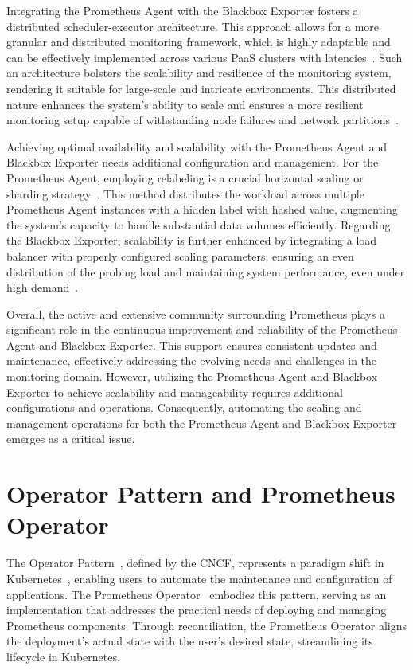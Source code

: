 Integrating the Prometheus Agent with the Blackbox Exporter fosters a distributed scheduler-executor architecture. This approach allows for a more granular and distributed monitoring framework, which is highly adaptable and can be effectively implemented across various \ac{PaaS} clusters with latencies~\parencite{UnderstandingUsingMultitarget}. Such an architecture bolsters the scalability and resilience of the monitoring system, rendering it suitable for large-scale and intricate environments. This distributed nature enhances the system's ability to scale and ensures a more resilient monitoring setup capable of withstanding node failures and network partitions~\parencite{plotkaIntroducingPrometheusAgent2021}.

Achieving optimal availability and scalability with the Prometheus Agent and Blackbox Exporter needs additional configuration and management. For the Prometheus Agent, employing relabeling is a crucial horizontal scaling or sharding strategy~\parencite{tsiliasHowRelabelingPrometheus2022}. This method distributes the workload across multiple Prometheus Agent instances with a hidden label with hashed value, augmenting the system's capacity to handle substantial data volumes efficiently. Regarding the Blackbox Exporter, scalability is further enhanced by integrating a load balancer with properly configured scaling parameters, ensuring an even distribution of the probing load and maintaining system performance, even under high demand~\parencite{plotkaIntroducingPrometheusAgent2021}.

Overall, the active and extensive community surrounding Prometheus plays a significant role in the continuous improvement and reliability of the Prometheus Agent and Blackbox Exporter. This support ensures consistent updates and maintenance, effectively addressing the evolving needs and challenges in the monitoring domain. However, utilizing the Prometheus Agent and Blackbox Exporter to achieve scalability and manageability requires additional configurations and operations. Consequently, automating the scaling and management operations for both the Prometheus Agent and Blackbox Exporter emerges as a critical issue.

\section{Operator Pattern and Prometheus Operator}

The Operator Pattern~\parencite{OperatorPattern}, defined by the \ac{CNCF}, represents a paradigm shift in Kubernetes~\parencite{ProductionGradeContainerOrchestration}, enabling users to automate the maintenance and configuration of applications. The Prometheus Operator~\parencite{PrometheusOperator} embodies this pattern, serving as an implementation that addresses the practical needs of deploying and managing Prometheus components. Through reconciliation, the Prometheus Operator aligns the deployment's actual state with the user's desired state, streamlining its lifecycle in Kubernetes. 

